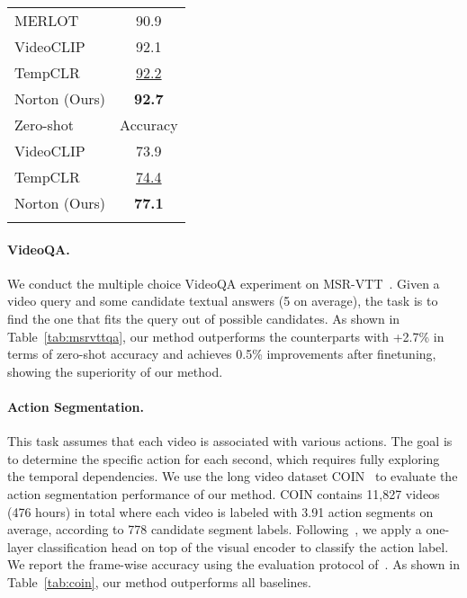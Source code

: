 \begin{table}[h]
{\begin{tabular}{lc}
MERLOT~\citep{merlot} & 90.9\\
VideoCLIP~\citep{videoclip} & {92.1} \\
TempCLR~\citep{tempclr} & \underline{92.2}\\
Norton (Ours) & \textbf{92.7}\\
\hline 
Zero-shot & Accuracy \\
\hline
VideoCLIP~\citep{videoclip}  & {73.9} \\
TempCLR~\citep{tempclr} & \underline{74.4}\\ 
Norton (Ours) & \textbf{77.1}
\\ 
\shline
\end{tabular}
}
\end{table}

\paragraph{VideoQA.} We conduct the multiple choice VideoQA experiment on MSR-VTT~\citep{jsfusion}. 
Given a video query and some candidate textual answers (5 on average), the task is to find the one that fits the query out of possible candidates. As shown in Table~\ref{tab:msrvttqa}, our method outperforms the counterparts with +2.7\% in terms of zero-shot accuracy and achieves 0.5\% improvements after finetuning, showing the superiority of our method.

\paragraph{Action Segmentation.} This task assumes that each video is associated with various actions. The goal is to determine the specific action for each second, which requires fully exploring the temporal dependencies. We use the long video dataset COIN~\citep{coin} to evaluate the action segmentation performance of our method. COIN contains 11,827 videos (476 hours) in total where each video is labeled with 3.91 action segments on average, according to 778 candidate segment labels. Following~\cite{videoclip}, we apply a one-layer classification head on top of the visual encoder to classify the action label. We report the frame-wise accuracy using the evaluation protocol of~\cite{videoclip,milnce}. As shown in Table~\ref{tab:coin}, our method outperforms all baselines.


